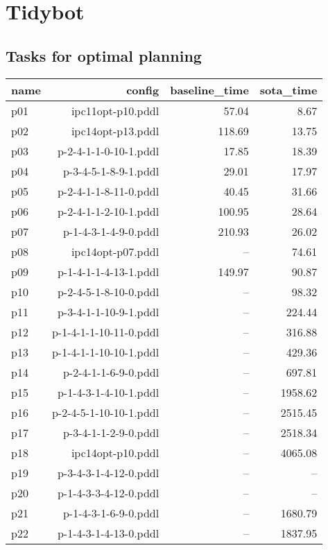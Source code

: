 \documentclass{article}
\begin{document}
                \newpage \section{Tidybot}
                    \subsection*{Tasks for optimal planning}
                    
                            \begin{center}
                            \scriptsize
                            \begin{tabular}{@{}l|r|r|r@{}}
                            name & config & baseline\_time & sota\_time\\\midrule
                              p01& ipc11opt-p10.pddl&57.04&8.67\\
  p02& ipc14opt-p13.pddl&118.69&13.75\\
  p03& p-2-4-1-1-0-10-1.pddl&17.85&18.39\\
  p04& p-3-4-5-1-8-9-1.pddl&29.01&17.97\\
  p05& p-2-4-1-1-8-11-0.pddl&40.45&31.66\\
  p06& p-2-4-1-1-2-10-1.pddl&100.95&28.64\\
  p07& p-1-4-3-1-4-9-0.pddl&210.93&26.02\\
  p08& ipc14opt-p07.pddl&--&74.61\\
  p09& p-1-4-1-1-4-13-1.pddl&149.97&90.87\\
  p10& p-2-4-5-1-8-10-0.pddl&--&98.32\\
  p11& p-3-4-1-1-10-9-1.pddl&--&224.44\\
  p12& p-1-4-1-1-10-11-0.pddl&--&316.88\\
  p13& p-1-4-1-1-10-10-1.pddl&--&429.36\\
  p14& p-2-4-1-1-6-9-0.pddl&--&697.81\\
  p15& p-1-4-3-1-4-10-1.pddl&--&1958.62\\
  p16& p-2-4-5-1-10-10-1.pddl&--&2515.45\\
  p17& p-3-4-1-1-2-9-0.pddl&--&2518.34\\
  p18& ipc14opt-p10.pddl&--&4065.08\\
  p19& p-3-4-3-1-4-12-0.pddl&--&--\\
  p20& p-1-4-3-3-4-12-0.pddl&--&--\\
  p21& p-1-4-3-1-6-9-0.pddl&--&1680.79\\
  p22& p-1-4-3-1-4-13-0.pddl&--&1837.95\\

\end{tabular}
\end{center}
\end{document}

